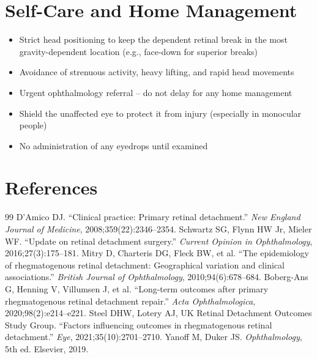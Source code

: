 \section*{Self-Care and Home Management}
\begin{itemize}
  \item Strict head positioning to keep the dependent retinal break in the most gravity-dependent location (e.g., face-down for superior breaks)
  \item Avoidance of strenuous activity, heavy lifting, and rapid head movements
  \item Urgent ophthalmology referral -- do not delay for any home management
  \item Shield the unaffected eye to protect it from injury (especially in monocular people)
  \item No administration of any eyedrops until examined
\end{itemize}

\section*{References}
\begin{thebibliography}{99}
 D'Amico DJ. ``Clinical practice: Primary retinal detachment.'' \textit{New England Journal of Medicine}, 2008;359(22):2346--2354.
 Schwartz SG, Flynn HW Jr, Mieler WF. ``Update on retinal detachment surgery.'' \textit{Current Opinion in Ophthalmology}, 2016;27(3):175--181.
 Mitry D, Charteris DG, Fleck BW, et al. ``The epidemiology of rhegmatogenous retinal detachment: Geographical variation and clinical associations.'' \textit{British Journal of Ophthalmology}, 2010;94(6):678--684.
 Boberg-Ans G, Henning V, Villumsen J, et al. ``Long-term outcomes after primary rhegmatogenous retinal detachment repair.'' \textit{Acta Ophthalmologica}, 2020;98(2):e214--e221.
 Steel DHW, Lotery AJ, UK Retinal Detachment Outcomes Study Group. ``Factors influencing outcomes in rhegmatogenous retinal detachment.'' \textit{Eye}, 2021;35(10):2701--2710.
 Yanoff M, Duker JS. \textit{Ophthalmology}, 5th ed. Elsevier, 2019.
\end{thebibliography}
